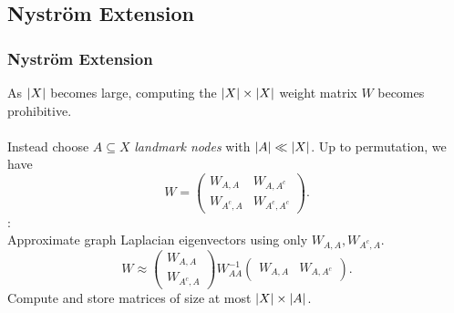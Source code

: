 \documentclass{beamer}
\begin{document}

\subsection{Nystr\"{o}m Extension}
\begin{frame}
  \frametitle{Nystr\"{o}m Extension}
  As $\left\lvert X\right\rvert$ becomes large, computing the $\left\lvert X\right\rvert\times \left\lvert X\right\rvert$ weight matrix $W$ becomes prohibitive. \\~\\
  Instead choose $A \subseteq X$ \emph{landmark nodes} with $\left\lvert A\right\rvert\ll\left\lvert X\right\rvert$. Up to permutation, we have
  \[  W = \begin{pmatrix} W_{A,A} & W_{A,A^c} \\ W_{A^c,A} & W_{A^c,A^c}
    \end{pmatrix}.\]
  \cite{Fowlkes04}: \\
  Approximate graph Laplacian eigenvectors using only $W_{A,A},W_{A^c,A}$.
  \[  W \approx \begin{pmatrix} W_{A,A} \\ W_{A^c,A} \end{pmatrix}
    W_{AA}^{-1} \begin{pmatrix} W_{A,A} & W_{A,A^c}\end{pmatrix}.\]
  Compute and store matrices of size at most $\left\lvert X\right\rvert\times\left\lvert A\right\rvert$.
\end{frame}

\end{document}
